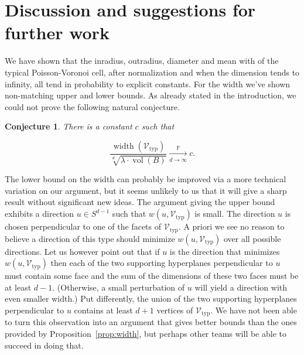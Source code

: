 \documentclass[11pt]{article}%
\newtheorem{conjecture} [theorem] {Conjecture}%
\newcommand{\Vcal}[0]{\ensuremath{{\mathcal V}}}
\newcommand{\Pee}[0]{\ensuremath{{\mathbb P}}}
\DeclareMathOperator{\vol}{vol}
\DeclareMathOperator{\width}{width}
\newcommand{\Vtyp}[0]{\Vcal_{\text{typ}}}
\begin{document}
\section{Discussion and suggestions for further work}


We have shown that the inradius, outradius, diameter and mean with of the typical Poisson-Voronoi cell,
after normalization and when the dimension tends to infinity, 
all tend in probability to explicit constants. For the width we've shown non-matching upper and lower bounds.
As already stated in the introduction, we could not prove the following natural conjecture.

\begin{conjecture}
There is a constant $c$ such that 

$$ \frac{\width(\Vtyp)}{\sqrt[d]{\lambda \cdot \vol(B)}} \xrightarrow[d\to\infty]{\Pee} c. $$

\end{conjecture}

The lower bound on the width can probably be improved via a more technical variation on our argument, 
but it seems unlikely to us that it will give a sharp result without significant new ideas.
The argument giving the upper bound exhibits a direction $u \in S^{d-1}$ such that 
$w(u,\Vtyp)$ is small. The direction $u$ is chosen perpendicular to one of the facets of $\Vtyp$.
A priori we see no reason to believe a direction of this type should minimize $w(u,\Vtyp)$ over all 
possible directions.
Let us however point out that if $u$ is the direction that minimizes $w(u,\Vtyp)$ then each 
of the two supporting hyperplanes
perpendicular to $u$ must contain some face and the sum of the dimensions of these two faces
must be at least $d-1$. (Otherwise, a small perturbation of $u$ will yield a direction with even smaller 
width.) Put differently, the union of the two supporting hyperplanes perpendicular to $u$ 
contains at least $d+1$ vertices of $\Vtyp$.
We have not been able to turn this observation into an argument that gives better bounds than the 
ones provided by Proposition~\ref{prop:width}, but perhaps other teams will be able to succeed in doing that.
\end{document}
